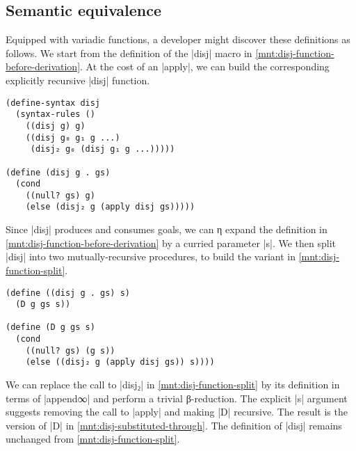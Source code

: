 \documentclass[sigplan,draft,natbib=false]{acmart}
\begin{document}
\subsection{Semantic equivalence}

Equipped with variadic functions, a developer might discover these
definitions as follows. We start from the definition of the
\rackinline|disj| macro in \cref{mnt:disj-function-before-derivation}.
At the cost of an \rackinline|apply|, we can build the corresponding
explicitly recursive \rackinline|disj| function.

\begin{listing}[h]
\begin{verbatim}
(define-syntax disj
  (syntax-rules ()
    ((disj g) g)
    ((disj g₀ g₁ g ...)
     (disj₂ g₀ (disj g₁ g ...)))))

(define (disj g . gs)
  (cond
    ((null? gs) g)
    (else (disj₂ g (apply disj gs)))))
\end{verbatim}
  \caption{Deriving \rackinline|disj| function from macro}
  \label{mnt:disj-function-before-derivation}
\end{listing}

\noindent Since \rackinline|disj| produces and consumes goals, we can
η expand the definition in \cref{mnt:disj-function-before-derivation}
by a curried parameter \rackinline|s|. We then split \rackinline|disj|
into two mutually-recursive procedures, to build the variant in
\cref{mnt:disj-function-split}.

\begin{listing}[h]
\begin{verbatim}
(define ((disj g . gs) s)
  (D g gs s))

(define (D g gs s)
  (cond
    ((null? gs) (g s))
    (else ((disj₂ g (apply disj gs)) s))))
\end{verbatim}
  \caption{An η expanded and split definition of \rackinline|disj|}
  \label{mnt:disj-function-split}
\end{listing}

\noindent We can replace the call to \rackinline|disj₂| in
\cref{mnt:disj-function-split} by its definition in terms of
\rackinline|append∞| and perform a trivial β-reduction. The explicit
\rackinline|s| argument suggests removing the call to
\rackinline|apply| and making \rackinline|D| recursive. The result is
the version of \rackinline|D| in \cref{mnt:disj-substituted-through}.
The definition of \rackinline|disj| remains unchanged from
\cref{mnt:disj-function-split}.
\end{document}
